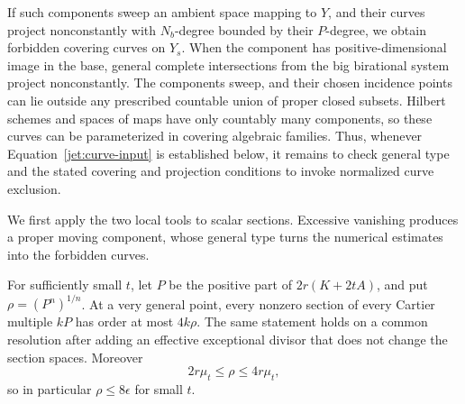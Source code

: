 If such components sweep an ambient space mapping to \(Y\), and
their curves project nonconstantly with \(N_b\)-degree bounded by
their \(P\)-degree, we obtain forbidden covering curves on \(Y_s\).
When the component has positive-dimensional image in the base, general
complete intersections from the big birational system project
nonconstantly. The components sweep, and their chosen incidence points
can lie outside any prescribed countable union of proper closed
subsets. Hilbert schemes and spaces of maps have only countably many
components, so these curves can be parameterized in covering algebraic
families. Thus, whenever Equation~\eqref{jet:curve-input} is
established below, it remains to check general type and the stated
covering and projection conditions to invoke normalized curve exclusion.

We first apply the two local tools to scalar sections.  Excessive
vanishing produces a proper moving component, whose general type
turns the numerical estimates into the forbidden curves.

\begin{proposition}\label{prop:scalar-jets}
For sufficiently small \(t\), let \(P\) be the positive part of
\(2r(K+2tA)\), and put \(\rho=(P^n)^{1/n}\).
At a very general point, every nonzero section of every Cartier
multiple \(kP\) has order at most \(4k\rho\).
The same statement holds on a common resolution after adding an
effective exceptional divisor that does not change the section
spaces.  Moreover
\[
 2r\mu_t\le\rho\le4r\mu_t,
\]
so in particular \(\rho\le8\epsilon\) for small \(t\).
\end{proposition}

